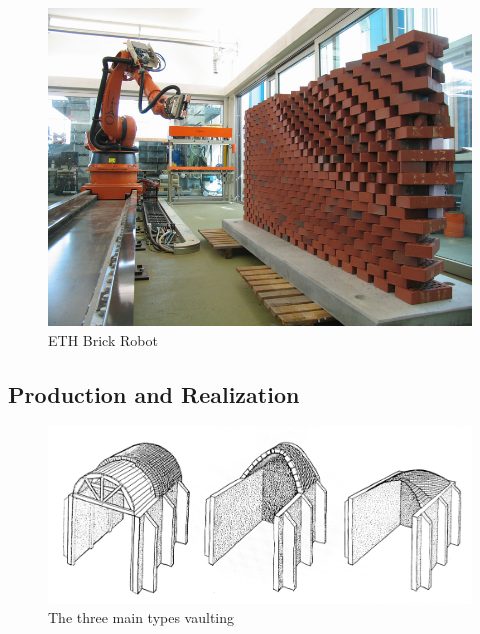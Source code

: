 \begin{figure}[H]
\centering
\includegraphics[width=0.9\linewidth ]{figure/Introduction/RobotBrick.jpg}
\caption{ETH Brick Robot}
\end{figure}



\subsection{Production and Realization}
\begin{figure}[H]
\centering
\includegraphics[width=0.9\linewidth ]{figure/Introduction/vaulting2.pdf}
\caption{The three main types vaulting}
\end{figure}






